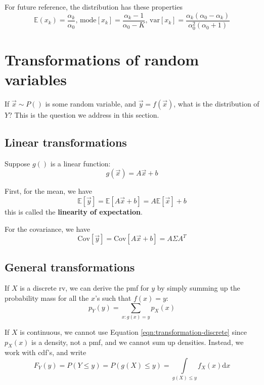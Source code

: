 \documentclass[graybox, envcountchap, twocolumn]{styles/svmult}
\begin{document}
For future reference, the distribution has these properties
\begin{equation}\label{eqn:Dirichlet-properties}
\mathbb{E}(x_k)=\dfrac{\alpha_k}{\alpha_0} \text{, mode}[x_k]=\dfrac{\alpha_k-1}{\alpha_0-K} \text{, var}[x_k]=\dfrac{\alpha_k(\alpha_0-\alpha_k)}{\alpha_0^2(\alpha_0+1)}
\end{equation}


\section{Transformations of random variables}
If $\vec{x} \sim P()$ is some random variable, and $\vec{y}=f(\vec{x})$, what is the distribution of $Y$? This is the question we address in this section.


\subsection{Linear transformations}
Suppose $g()$ is a linear function: 
\begin{equation}
g(\vec{x})=A\vec{x}+b
\end{equation}

First, for the mean, we have
\begin{equation}
\mathbb{E}[\vec{y}]=\mathbb{E}[A\vec{x}+b]=A\mathbb{E}[\vec{x}]+b
\end{equation}
this is called the \textbf{linearity of expectation}.

For the covariance, we have
\begin{equation}
\text{Cov}[\vec{y}]=\text{Cov}[A\vec{x}+b]=A\Sigma A^T
\end{equation}


\subsection{General transformations}
\label{sec:General-transformations}
If $X$ is a discrete rv, we can derive the pmf for $y$ by simply summing up the probability mass for all the $x$’s such that $f(x)=y$:
\begin{equation}\label{eqn:transformation-discrete}
p_Y(y)=\sum\limits_{x:g(x)=y}p_X(x)
\end{equation}

If $X$ is continuous, we cannot use Equation \ref{eqn:transformation-discrete} since $p_X(x)$ is a density, not a pmf, and we cannot sum up densities. Instead, we work with cdf’s, and write
\begin{equation}
F_Y(y)=P(Y \leq y)=P(g(X) \leq y)=\int\limits_{g(X) \leq y} f_X(x)\mathrm{d}x
\end{equation}
\end{document}
